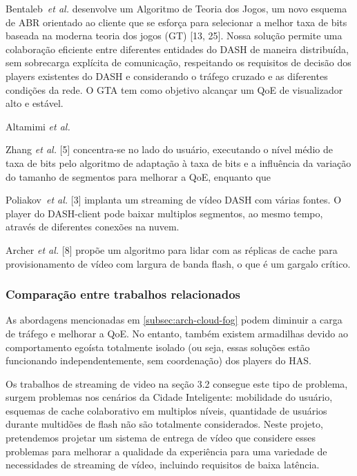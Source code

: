 Bentaleb~\textit{et al.} desenvolve um Algoritmo de Teoria dos Jogos, um novo esquema de ABR orientado ao cliente que se esforça para selecionar a melhor taxa de bits baseada na moderna teoria dos jogos (GT) [13, 25]. Nossa solução permite uma colaboração eficiente entre diferentes entidades do DASH de maneira distribuída, sem sobrecarga explícita de comunicação, respeitando os requisitos de decisão dos players existentes do DASH e considerando o tráfego cruzado e as diferentes condições da rede. O GTA tem como objetivo alcançar um QoE de visualizador alto e estável.


Altamimi \textit{et al.} 

Zhang \textit{et al.} [5] concentra-se no lado do usuário, executando o nível médio de taxa de bits pelo algoritmo de adaptação à taxa de bits e a influência da variação do tamanho de segmentos para melhorar a QoE, enquanto que 

Poliakov~\textit{et al.} [3] implanta um streaming de vídeo DASH com várias fontes. O player do DASH-client pode baixar multiplos segmentos, ao mesmo tempo, através de diferentes conexões na nuvem. 

Archer \textit{et al.} [8] propõe um algoritmo para lidar com as réplicas de cache para provisionamento de vídeo com largura de banda flash, o que é um gargalo crítico.

\subsubsection{Comparação entre trabalhos relacionados}
\label{subsec:applications}

As abordagens mencionadas em \autoref{subsec:arch-cloud-fog} podem diminuir a carga de tráfego 
e melhorar a QoE. No entanto, também existem armadilhas devido ao comportamento egoísta totalmente isolado (ou seja, essas soluções estão funcionando independentemente, sem coordenação) dos players do HAS.

Os trabalhos de streaming de video na seção 3.2 consegue este tipo de problema, surgem problemas nos cenários da Cidade Inteligente: mobilidade do usuário, esquemas de cache colaborativo em multiplos níveis, quantidade de usuários durante multidões de flash não são totalmente considerados. Neste projeto, pretendemos projetar um sistema de entrega de vídeo que considere esses problemas para melhorar a qualidade da experiência para uma variedade de necessidades de streaming de vídeo, incluindo requisitos de baixa latência.

